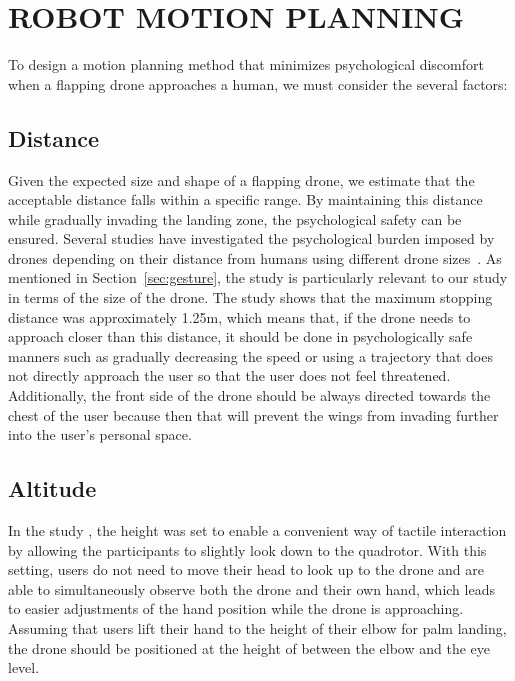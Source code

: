 \section{ROBOT MOTION PLANNING}

\label{sec:motion-planning}

To design a motion planning method that minimizes psychological discomfort when a flapping drone approaches a human, we must consider the several factors:

\subsection{Distance}
\label{sec:distance}
Given the expected size and shape of a flapping drone, we estimate that the acceptable distance falls within a specific range. 
By maintaining this distance while gradually invading the landing zone, the psychological safety can be ensured.
Several studies have investigated the psychological burden imposed by drones depending on their distance from humans using different drone sizes~\cite{Yeh2017Proxemics, lieser2021evaluating-distances,Duncan2013comfortable-approach, Acharya2017robot-vs-drone-comfort}.
As mentioned in Section~\ref{sec:gesture}, the study \cite{lieser2021evaluating-distances} is particularly relevant to our study in terms of the size of the drone.
The study shows that the maximum stopping distance was approximately 1.25m,
which means that, if the drone needs to approach closer than this distance, it should be done in psychologically safe manners such as gradually decreasing the speed or using a trajectory that does not directly approach the user so that the user does not feel threatened.
Additionally, the front side of the drone should be always directed towards the chest of the user
because then that will prevent the wings from invading further into the user's personal space.

\subsection{Altitude}

In the study \cite{lieser2021evaluating-distances}, the height was set to enable a convenient way of tactile interaction 
by allowing the participants to slightly look down to the quadrotor.
With this setting, users do not need to move their head to look up to the drone and are able to simultaneously observe both the drone and their own hand, 
which leads to easier adjustments of the hand position while the drone is approaching.
Assuming that users lift their hand to the height of their elbow for palm landing, the drone should be positioned at the height of between the elbow and the eye level.

